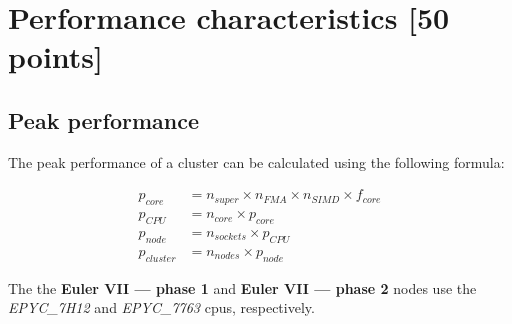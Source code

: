 \documentclass[unicode,11pt,a4paper,oneside,numbers=endperiod,openany]{scrartcl}
\begin{document}
\section{Performance characteristics [50 points]}

\subsection{Peak performance}

The peak performance of a cluster can be calculated using the following formula:


\begin{align*}
    p_{core}    & = n_{super} \times n_{FMA} \times n_{SIMD} \times f_{core} \\
    p_{CPU}     & = n_{core} \times p_{core}                                 \\
    p_{node}    & = n_{sockets} \times p_{CPU}                               \\
    p_{cluster} & = n_{nodes} \times p_{node}
\end{align*}

The the \textbf{Euler VII — phase 1} and \textbf{Euler VII — phase 2} nodes use the \textit{EPYC\_7H12} and \textit{EPYC\_7763} cpus, respectively.
\end{document}
